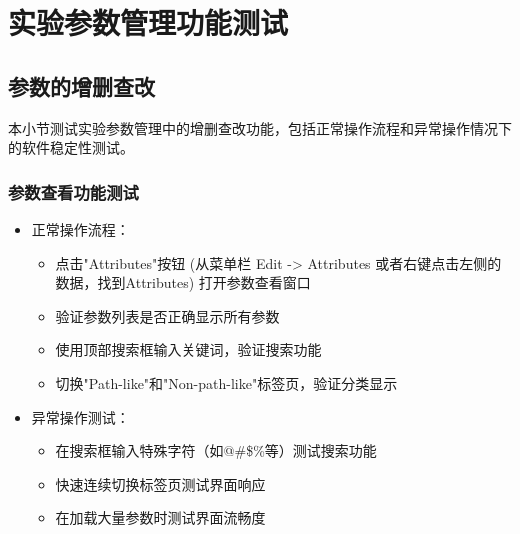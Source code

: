 \documentclass[a4paper,12pt]{report}	%
\begin{document}
\chapter{实验参数管理功能测试}

\section{参数的增删查改}

本小节测试实验参数管理中的增删查改功能，包括正常操作流程和异常操作情况下的软件稳定性测试。

\subsection{参数查看功能测试}
\begin{itemize}
    \item 正常操作流程：
    \begin{itemize}
        \item 点击"Attributes"按钮 (从菜单栏 Edit -> Attributes 或者右键点击左侧的数据，找到Attributes) 打开参数查看窗口
        \item 验证参数列表是否正确显示所有参数
        \item 使用顶部搜索框输入关键词，验证搜索功能
        \item 切换"Path-like"和"Non-path-like"标签页，验证分类显示
    \end{itemize}
    
    \item 异常操作测试：
    \begin{itemize}
        \item 在搜索框输入特殊字符（如@\#\$\%等）测试搜索功能
        \item 快速连续切换标签页测试界面响应
        \item 在加载大量参数时测试界面流畅度
    \end{itemize}
\end{itemize}
\end{document}
